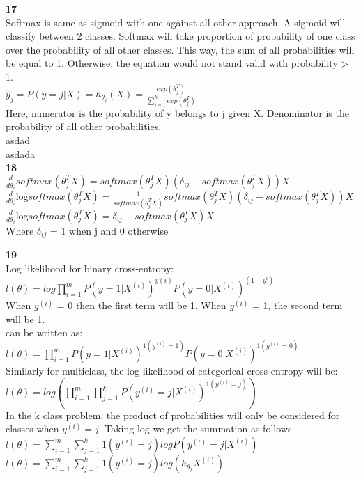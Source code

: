 \documentclass{article}
\begin{document}
\textbf{17}\bigskip \\
Softmax is same as sigmoid with one against all other approach. A sigmoid will classify between 2 classes. Softmax will take proportion of probability of one class over the probability of all other classes. This way, the sum of all probabilities will be equal to 1. Otherwise, the equation would not stand valid with probability > 1.\smallskip \\
$\hat{y}_{j} = P(y=j|X) = h_{\theta_j}(X)=\frac{exp(\theta_{j}^{T})}{\sum_{i=1}^{k}exp(\theta_{j}^{T})}$ \smallskip \\
Here, numerator is the probability of y belongs to j given X. Denominator is the probability of all other probabilities.\bigskip \\

asdad \\
asdada\\

\textbf{18}\bigskip \\
$\frac{d}{d\theta_{i}}softmax(\theta_j^{T}X) = softmax(\theta_j^{T}X)(\delta_{ij}-softmax(\theta_j^{T}X))X$\smallskip \\
$\frac{d}{d\theta_{i}}$log$softmax(\theta_j^{T}X) = \frac{1}{softmax(\theta_j^{T}X)}softmax(\theta_j^{T}X)(\delta_{ij}-softmax(\theta_j^{T}X))X$\smallskip \\
$\frac{d}{d\theta_{i}}$log$softmax(\theta_j^{T}X) = \delta_{ij}-softmax(\theta_j^{T}X)X$\smallskip \\
Where $\delta_{ij}$ = 1 when j and 0 otherwise

\textbf{19}\bigskip \\
Log likelihood for binary cross-entropy:\smallskip \\
$l(\theta)=log \prod_{i=1}^{m}P(y=1|X^{(i)})^{y(i)}P(y=0|X^{(i)})^{(1-y^{i})}$ \smallskip \\
When $y^{(i)}$ = 0 then the first term will be 1. When $y^{(i)}$ = 1, the second term will be 1.\smallskip \\
can be written as:\smallskip \\
$l(\theta) = \prod_{i=1}^{m}P(y=1|X^{(i)})^{1(y^{(i)}=1)}P(y=0|X^{(i)})^{1(y^{(i)}=0)}$\smallskip \\
Similarly for multiclass, the log likelihood of categorical cross-entropy will be:\smallskip \\
$l(\theta) = log(\prod_{i=1}^{m}\prod_{j=1}^{k}P(y^{(i)}=j|X^{(i)})^{1(y^{(i)}=j)})$\smallskip \\
In the k class problem, the product of probabilities will only be considered for classes when $y^{(i)}=j$. Taking log we get the summation as follows\smallskip \\
$l(\theta) = \sum_{i=1}^{m}\sum_{j=1}^{k}1(y^{(i)}=j)log P(y^{(i)}=j|X^{(i)})$\smallskip \\
$l(\theta) = \sum_{i=1}^{m}\sum_{j=1}^{k}1(y^{(i)}=j)log(h_{\theta_j}X^{(i)})$\bigskip \\
\end{document}
